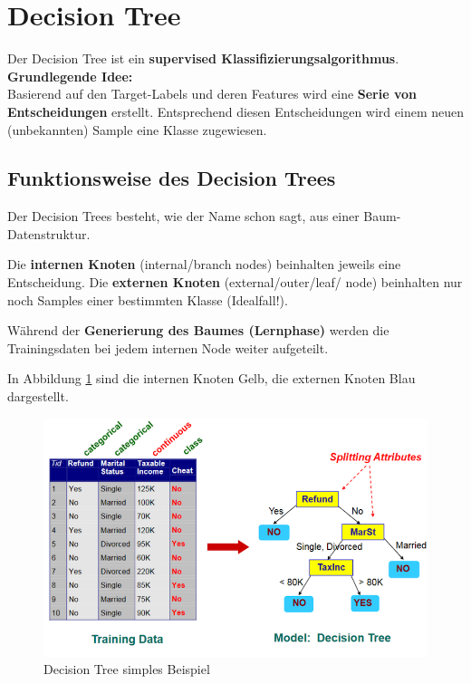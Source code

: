 \newpage
\section{Decision Tree}

Der Decision Tree ist ein \textbf{supervised Klassifizierungsalgorithmus}. \\

\textbf{Grundlegende Idee:} \\
Basierend auf den Target-Labels und deren Features wird eine \textbf{Serie von Entscheidungen} erstellt. Entsprechend diesen Entscheidungen wird einem neuen (unbekannten) Sample eine Klasse zugewiesen. 

\subsection{Funktionsweise des Decision Trees}

Der Decision Trees besteht, wie der Name schon sagt, aus einer Baum-Datenstruktur. 

Die \textbf{internen Knoten} (internal/branch nodes) beinhalten jeweils eine Entscheidung. Die \textbf{externen Knoten} (external/outer/leaf/ node) beinhalten nur noch Samples einer bestimmten Klasse (Idealfall!).

Während der \textbf{Generierung des Baumes (Lernphase)} werden die Trainingsdaten bei jedem internen Node weiter aufgeteilt.

In Abbildung \ref{fig:dt_simple} sind die internen Knoten Gelb, die externen Knoten Blau dargestellt.

\begin{figure}[h!]
	\includegraphics[scale=0.8]{figures/decision_tree_simple}
	\caption{Decision Tree simples Beispiel}
	\label{fig:dt_simple}
\end{figure}


